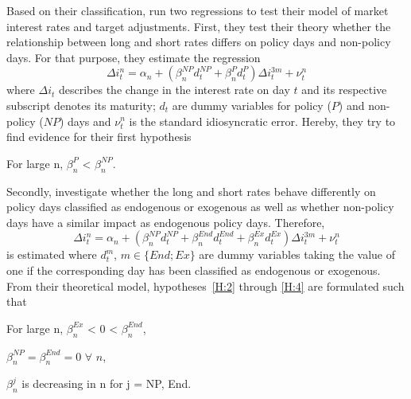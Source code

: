 Based on their classification, \textcite{Ellingsen.2003} run two regressions to test their model of market interest rates and target adjustments. First, they test their theory whether the relationship between long and short rates differs on policy days and non-policy days. For that purpose, they estimate the regression
%
\begin{equation}
	\label{eq:PvsNP}
	\Delta i_t^n = \alpha_n + (\beta_n^{NP}d_t^{NP}+\beta_n^{P}d_t^{P})\Delta i_t^{3m}+\nu_t^n
\end{equation}
%
where $\Delta i_t$ describes the change in the interest rate on day $t$ and its respective subscript denotes its maturity; $d_t$ are dummy variables for policy ($P$) and non-policy ($NP$) days and $\nu_t^n$ is the standard idiosyncratic error. Hereby, they try to find evidence for their first hypothesis 
%
\begin{hypothesis}
	\label{H:1}
	For large n, $\beta_n^P$ < $\beta_n^{NP}$.
\end{hypothesis}
%

Secondly, \textcite{Ellingsen.2003} investigate whether the long and short rates behave differently on policy days classified as endogenous or exogenous as well as whether non-policy days have a similar impact as endogenous policy days. Therefore, 
%
\begin{equation}
	\label{eq:EndvsEx}
	\Delta i_t^n = \alpha_n + (\beta_n^{NP}d_t^{NP}+\beta_n^{End}d_t^{End}+\beta_n^{Ex}d_t^{Ex})\Delta i_t^{3m}+\nu_t^n
\end{equation}
%
is estimated where $d_t^{m}$, $m\in \{End;Ex\}$ are dummy variables taking the value of one if the corresponding day has been classified as endogenous or exogenous. From their theoretical model, hypotheses~\ref{H:2} through \ref{H:4} are formulated such that
\begin{hypothesis}
	\label{H:2}
	For large n, $\beta_n^{Ex}$ < 0 < $\beta_n^{End}$,
\end{hypothesis}
%
\begin{hypothesis}
	\label{H:3}
	$\beta_n^{NP} = \beta_n^{End} = 0$ $\forall$ $n$,
\end{hypothesis}
%
\begin{hypothesis}
	\label{H:4}
	$\beta_n^{j}$ is decreasing in n for j = NP, End.
\end{hypothesis}
%

